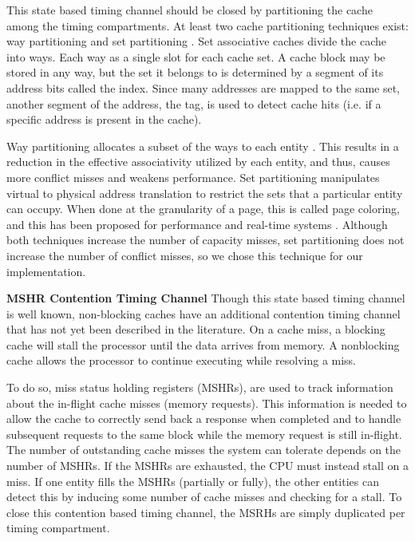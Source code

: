 This state based timing channel should be closed by partitioning the cache 
among the timing compartments. At least two cache partitioning techniques 
exist: way partitioning and set partitioning 
\cite{rtas_cache_framework,dynamic_partitioning}. Set associative caches divide 
the cache into ways. Each way as a single slot for each cache set. A cache 
block may be stored in any way, but the set it belongs to is determined by a 
segment of its address bits called the index. Since many addresses are mapped 
to the same set, another segment of the address, the tag, is used to detect 
cache hits (i.e. if a specific address is present in the cache).

Way partitioning allocates a subset of the ways to each entity 
\cite{citation_needed}. This results in a reduction in the effective 
associativity utilized by each entity, and thus, causes more conflict misses 
and weakens performance. Set partitioning manipulates virtual to physical 
address translation to restrict the sets that a particular entity can occupy.  
When done at the granularity of a page, this is called page coloring, and this 
has been proposed for performance \cite{citation_needed} and real-time systems 
\cite{rtas_cache_framework}.  Although both techniques increase the number of 
capacity misses, set partitioning does not increase the number of conflict 
misses, so we chose this technique for our implementation.

\textbf{MSHR Contention Timing Channel}
Though this state based timing channel is well known, non-blocking caches have 
an additional contention timing channel that has not yet been described in the 
literature. On a cache miss, a blocking cache will stall the processor until 
the data arrives from memory. A nonblocking cache allows the processor to 
continue executing while resolving a miss.

To do so, miss status holding registers (MSHRs), are used to track information 
about the in-flight cache misses (memory requests). This information is  needed 
to allow the cache to correctly send back a response when completed and to 
handle subsequent requests to the same block while the memory request is still 
in-flight.
The number of outstanding cache misses the system can tolerate depends on the 
number of MSHRs. If the MSHRs are exhausted, the CPU must instead stall on a 
miss. If one entity fills the MSHRs (partially or fully), the other entities 
can detect this by inducing some number of cache misses and checking for a 
stall. To close this contention based timing channel, the MSRHs are simply 
duplicated per timing compartment.

